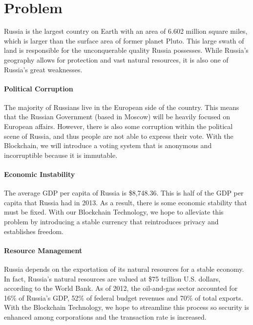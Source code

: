 \documentclass[12pt]{article}
\begin{document}
\section{Problem}
Russia is the largest country on Earth with an area of 6.602 million square miles, which is larger than the surface area of former planet Pluto. This large swath of land is responsible for the unconquerable quality Russia possesses. While Russia's geography allows for protection and vast natural resources, it is also one of Russia's great weaknesses.

\paragraph{Political Corruption} The majority of Russians live in the European side of the country. This means that the Russian Government (based in Moscow) will be heavily focused on European affairs. However, there is also some corruption within the political scene of Russia, and thus people are not able to express their vote. With the Blockchain, we will introduce a voting system that is anonymous and incorruptible because it is immutable.

\paragraph{Economic Instability} The average GDP per capita of Russia is \$8,748.36. This is half of the GDP per capita that Russia had in 2013. As a result, there is some economic stability that must be fixed. With our Blockchain Technology, we hope to alleviate this problem by introducing a stable currency that reintroduces privacy and establishes freedom.

\paragraph{Resource Management} Russia depends on the exportation of its natural resources for a stable economy. In fact, Russia's natural resources are valued at \$75 trillion U.S. dollars, according to the World Bank. As of 2012, the oil-and-gas sector accounted for 16\% of Russia's GDP, 52\% of federal budget revenues and 70\% of total exports. With the Blockchain Technology, we hope to streamline this process so security is enhanced among corporations and the transaction rate is increased.
\pagebreak
\end{document}
